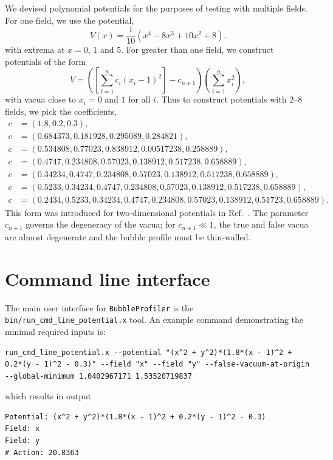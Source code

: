 \documentclass[final,3p,11pt,pdflatex]{elsarticle}
\makeatletter
\renewcommand{\tfrac}{\frac}
\newcommand{\bp}{\texttt{BubbleProfiler}\@\xspace}
\newcommand{\code}[1]{\ifmmode\text{\nolinkurl{#1}}\else\nolinkurl{#1}\fi}
\newcommand{\refcite}[1]{Ref.~\cite{#1}}
\makeatother
\begin{document}
We devised polynomial potentials for the purposes of testing with multiple
fields. For one field, we use the potential,
\begin{equation}
V(x) = \tfrac{1}{10}\left(x^4 -8 x^3 + 10 x^2 + 8\right).
\end{equation}
with extrema at $x = 0$, $1$ and $5$. For greater than one field, we construct potentials of the form
\begin{equation}
V = \left( \left[\sum_{i=1}^n c_i (x_i - 1)^2\right] - c_{n+1} \right)\left(\sum_{i=1}^n x_i^2\right),
\end{equation}
with vacua close to $x_i = 0$ and $1$ for all $i$. Thus to construct potentials
with $2$--$8$ fields, we pick the coefficients,
\begin{align}
c&=\left(1.8, 0.2, 0.3\right), \label{eq:2_field_potential}\\
c&=\left(0.684373, 0.181928, 0.295089, 0.284821\right),\\
c&=\left(0.534808, 0.77023, 0.838912, 0.00517238, 0.258889\right),\\
c&=\left(0.4747, 0.234808, 0.57023, 0.138912, 0.517238, 0.658889\right),\\
c&=\left(0.34234, 0.4747, 0.234808, 0.57023, 0.138912, 0.517238, 0.658889
\right),\\
c&=\left(0.5233, 0.34234, 0.4747, 0.234808, 0.57023, 0.138912, 0.517238,
0.658889\right),\\
c&=\left(0.2434, 0.5233, 0.34234, 0.4747, 0.234808, 0.57023, 0.138912,
0.51723, 0.658889\right).
\end{align}
This form was introduced for two-dimensional potentials in
\refcite{Wainwright:2011kj}. The parameter $c_{n+1}$ governs the degeneracy
of the vacua; for $c_{n+1} \ll 1$, the true and false vacua are almost
degenerate and the bubble profile must be thin-walled.

\section{Command line interface}
\label{sec:User-Options}
The main user interface for \bp is the \code{bin/run_cmd_line_potential.x} tool.
An example command demonstrating the minimal required inputs is:

\begin{lstlisting}[language={}]
run_cmd_line_potential.x --potential "(x^2 + y^2)*(1.8*(x - 1)^2 + 0.2*(y - 1)^2 - 0.3)" --field "x" --field "y" --false-vacuum-at-origin --global-minimum 1.0402967171 1.53520719837
\end{lstlisting}
%
which results in output
%
\begin{lstlisting}[language={}]
Potential: (x^2 + y^2)*(1.8*(x - 1)^2 + 0.2*(y - 1)^2 - 0.3)  
Field: x
Field: y
# Action: 20.8363
\end{lstlisting}
\end{document}
